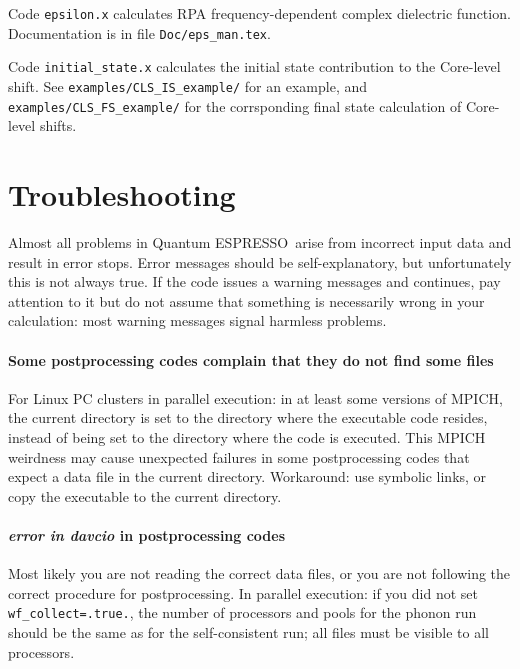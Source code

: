 \documentclass[12pt,a4paper]{article}
\def\qe{{\sc Quantum ESPRESSO}}
\begin{document}
Code \texttt{epsilon.x} calculates RPA frequency-dependent complex dielectric 
function. Documentation is in file \texttt{Doc/eps\_man.tex}.

Code \texttt{initial\_state.x} calculates the initial state contribution
to the Core-level shift. See \texttt{examples/CLS\_IS\_example/} for
an example, and \texttt{examples/CLS\_FS\_example/} for the corrsponding
final state calculation of Core-level shifts.

\section{Troubleshooting}

Almost all problems in \qe\ arise from incorrect input data and result in
error stops. Error messages should be self-explanatory, but unfortunately
this is not always true. If the code issues a warning messages and continues,
pay attention to it but do not assume that something is necessarily wrong in
your calculation: most warning messages signal harmless problems.

\paragraph{Some postprocessing codes complain that they do not find some files}
For Linux PC clusters in parallel execution: in at least some versions
of MPICH, the current directory is set to the directory where the executable
code resides, instead of being set to the directory where the code is executed.
This MPICH weirdness may cause unexpected failures in some postprocessing
codes that expect a data file in the current directory. Workaround: use
symbolic links, or copy the executable to the current directory.

\paragraph{{\em error in davcio} in postprocessing codes}
Most likely you are not reading the correct data files, or you are not
following the correct procedure for postprocessing. In parallel execution: 
if you did not set \texttt{wf\_collect=.true.}, the number of processors and 
pools for the phonon run should be the same as for the
self-consistent run; all files must be visible to all processors.
\end{document}
